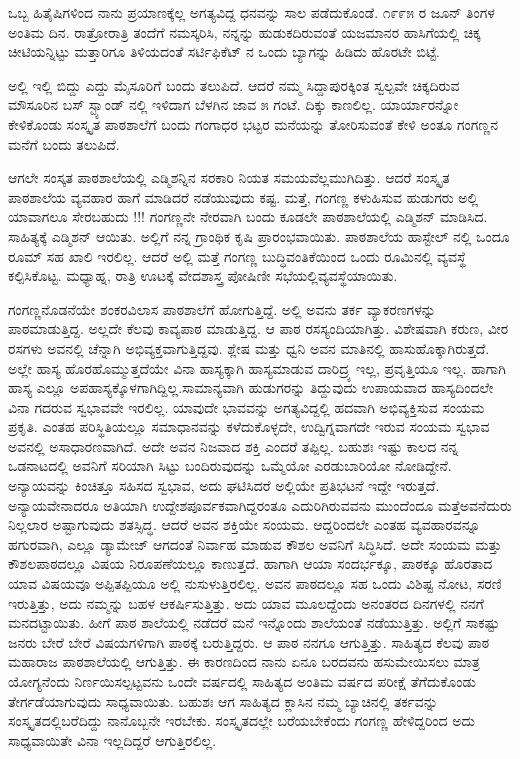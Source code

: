 {ಒಬ್ಬ ಹಿತೈಷಿಗಳಿಂದ ನಾನು ಪ್ರಯಾಣಕ್ಕೆಲ್ಲ ಅಗತ್ಯವಿದ್ದ ಧನವನ್ನು ಸಾಲ ಪಡೆದುಕೊಂಡೆ. ೧೯೯೫ ರ ಜೂನ್ ತಿಂಗಳ ಅಂತಿಮ ದಿನ. ರಾತ್ರೋರಾತ್ರಿ ತಂದೆಗೆ ನಮಸ್ಕರಿಸಿ, ನನ್ನನ್ನು ಹುಡುಕದಿರುವಂತೆ ಯಜಮಾನರ ಹಾಸಿಗೆಯಲ್ಲಿ ಚಿಕ್ಕ ಚೀಟಿಯನ್ನಿಟ್ಟು ಮತ್ತಾರಿಗೂ ತಿಳಿಯದಂತೆ ಸರ್ಟಿಫಿಕೆಟ್ ನ ಒಂದು ಬ್ಯಾಗನ್ನು ಹಿಡಿದು ಹೊರಟೇ ಬಿಟ್ಟೆ.

ಅಲ್ಲಿ ಇಲ್ಲಿ ಬಿದ್ದು ಎದ್ದು ಮೈಸೂರಿಗೆ ಬಂದು ತಲುಪಿದೆ. ಆದರೆ ನಮ್ಮ ಸಿದ್ದಾಪುರಕ್ಕಿಂತ ಸ್ವಲ್ಪವೇ ಚಿಕ್ಕದಿರುವ ಮೌಸೂರಿನ ಬಸ್ ಸ್ಟ್ಯಾಂಡ್ ನಲ್ಲಿ ಇಳಿದಾಗ ಬೆಳಗಿನ ಜಾವ ೫ ಗಂಟೆ. ದಿಕ್ಕು ಕಾಣಲಿಲ್ಲ. ಯಾರ್ಯಾರನ್ನೋ ಕೇಳಿಕೊಂಡು ಸಂಸ್ಕೃತ ಪಾಠಶಾಲೆಗೆ ಬಂದು ಗಂಗಾಧರ ಭಟ್ಟರ ಮನೆಯನ್ನು ತೋರಿಸುವಂತೆ ಕೇಳಿ ಅಂತೂ ಗಂಗಣ್ಣನ ಮನೆಗೆ ಬಂದು ತಲುಪಿದೆ. 

ಆಗಲೇ ಸಂಸ್ಕತ ಪಾಠಶಾಲೆಯಲ್ಲಿ ಎಡ್ಮಿಶನ್ನಿನ ಸರಕಾರಿ ನಿಯತ ಸಮಯವೆಲ್ಲ\break ಮುಗಿದಿತ್ತು. ಆದರೆ ಸಂಸ್ಕೃತ ಪಾಠಶಾಲೆಯ ವ್ಯವಹಾರ ಹಾಗೆ ಮಾಡಿದರೆ ನಡೆಯು\-ವುದು ಕಷ್ಟ. ಮತ್ತೆ, ಗಂಗಣ್ಣ ಕಳುಹಿಸುವ ಹುಡುಗರು ಅಲ್ಲಿ ಯಾವಾಗಲೂ ಸೇರ\-ಬಹುದು !!! ಗಂಗಣ್ಣನೇ ನೇರವಾಗಿ ಬಂದು ಕೂಡಲೇ ಪಾಠಶಾಲೆಯಲ್ಲಿ ಎಡ್ಮಿಶನ್ ಮಾಡಿಸಿದ. ಸಾಹಿತ್ಯಕ್ಕೆ ಎಡ್ಮಿಶನ್ ಆಯಿತು. ಅಲ್ಲಿಗೆ ನನ್ನ ಗ್ರಾಂಥಿಕ ಕೃಷಿ ಪ್ರಾರಂಭ\-ವಾಯಿತು. ಪಾಠಶಾಲೆಯ ಹಾಸ್ಟೇಲ್ ನಲ್ಲಿ ಒಂದೂ ರೂಮ್ ಸಹ ಖಾಲಿ ಇರಲಿಲ್ಲ. ಆದರೆ ಅಲ್ಲಿ ಮತ್ತೆ ಗಂಗಣ್ಣ  ಬುದ್ಧಿವಂತಿಕೆಯಿಂದ ಒಂದು ರೂಮಿನಲ್ಲಿ ವ್ಯವಸ್ಥೆ ಕಲ್ಪಿಸಿ\-ಕೊಟ್ಟ. ಮಧ್ಯಾಹ್ನ, ರಾತ್ರಿ ಊಟಕ್ಕೆ ವೇದಶಾಸ್ತ್ರ ಪೋಷಿಣೀ ಸಭೆಯಲ್ಲಿ\break ವ್ಯವಸ್ಥೆಯಾಯಿತು. 

ಗಂಗಣ್ಣನೊಡನೆಯೇ ಶಂಕರವಿಲಾಸ ಪಾಠಶಾಲೆಗೆ ಹೋಗುತ್ತಿದ್ದೆ. ಅಲ್ಲಿ ಅವನು ತರ್ಕ ವ್ಯಾಕರಣಗಳನ್ನು ಪಾಠಮಾಡುತ್ತಿದ್ದ. ಅಲ್ಲದೇ ಕೆಲವು ಕಾವ್ಯಪಾಠ ಮಾಡುತ್ತಿದ್ದ. ಆ ಪಾಠ ರಸಸ್ಯಂದಿಯಾಗಿತ್ತು. ವಿಶೇಷವಾಗಿ ಕರುಣ, ವೀರ ರಸಗಳು ಅವನಲ್ಲಿ ಚೆನ್ನಾಗಿ ಅಭಿವ್ಯಕ್ತವಾಗುತ್ತಿದ್ದವು. ಶ್ಲೇಷ ಮತ್ತು ಧ್ವನಿ ಅವನ ಮಾತಿನಲ್ಲಿ ಹಾಸುಹೊಕ್ಕಾಗಿರುತ್ತದೆ. ಅಲ್ಲೇ ಹಾಸ್ಯ ಹೊರಹೊಮ್ಮುತ್ತದೆಯೇ ವಿನಾ ಹಾಸ್ಯಕ್ಕಾಗಿ ಹಾಸ್ಯಮಾಡುವ ದಾರಿದ್ರ್ಯ ಇಲ್ಲ, ಪ್ರವೃತ್ತಿಯೂ ಇಲ್ಲ. ಹಾಗಾಗಿ ಹಾಸ್ಯ ಎಲ್ಲೂ ಅಪಹಾಸ್ಯಕ್ಕೊಳಗಾಗಿದ್ದಿಲ್ಲ.\break ಸಾಮಾನ್ಯವಾಗಿ ಹುಡುಗರನ್ನು ತಿದ್ದುವುದು ಉಪಾಯವಾದ ಹಾಸ್ಯದಿಂದಲೇ ವಿನಾ ಗದರುವ ಸ್ವಭಾವವೇ ಇರಲಿಲ್ಲ. ಯಾವುದೇ ಭಾವವನ್ನು ಅಗತ್ಯವಿದ್ದಲ್ಲಿ ಹದವಾಗಿ ಅಭಿವ್ಯಕ್ತಿಸುವ ಸಂಯಮ ಪ್ರಕೃತಿ. ಎಂತಹ ಪರಿಸ್ಥಿತಿಯಲ್ಲೂ ಸಮಾಧಾನವನ್ನು ಕಳೆದು\-ಕೊಳ್ಳದೇ, ಉದ್ವಿಗ್ನವಾಗದೇ ಇರುವ ಸಂಯಮ ಸ್ವಭಾವ ಅವನಲ್ಲಿ ಅಸಾಧಾರಣ\-ವಾಗಿದೆ. ಅದೇ ಅವನ ನಿಜವಾದ ಶಕ್ತಿ ಎಂದರೆ ತಪ್ಪಿಲ್ಲ. ಬಹುಶಃ ಇಷ್ಟು ಕಾಲದ ನನ್ನ ಒಡನಾಟದಲ್ಲಿ ಅವನಿಗೆ ಸರಿಯಾಗಿ ಸಿಟ್ಟು ಬಂದಿರುವುದನ್ನು   ಒಮ್ಮೆಯೋ ಎರಡು\break ಬಾರಿಯೋ ನೋಡಿದ್ದೇನೆ. ಅನ್ಯಾಯವನ್ನು ಕಿಂಚಿತ್ತೂ ಸಹಿಸದ ಸ್ವಭಾವ, ಅದು ಘಟಿಸಿದರೆ ಅಲ್ಲಿಯೇ ಪ್ರತಿಭಟನೆ ಇದ್ದೇ ಇರುತ್ತದೆ. ಅನ್ಯಾಯವೇನಾದರೂ  ಅತಿಯಾಗಿ ಉದ್ದೇಶಪೂರ್ವಕವಾಗಿದ್ದರಂತೂ ಎದುರಿಗಿರುವವನು ಮುಂದೆಂದೂ ಮತ್ತೆ\break ಅವನೆದುರು ನಿಲ್ಲಲಾರ \enginline{-} ಅಷ್ಟಾಗುವುದು ಶತಸ್ಸಿದ್ಧ. ಆದರೆ ಅವನ ಶಕ್ತಿಯೇ ಸಂಯಮ. ಆದ್ದರಿಂದಲೇ ಎಂತಹ ವ್ಯವಹಾರವನ್ನೂ ಹಗುರವಾಗಿ, ಎಲ್ಲೂ ಡ್ಯಾಮೇಜ್ ಆಗದಂತೆ ನಿರ್ವಾಹ ಮಾಡುವ ಕೌಶಲ ಅವನಿಗೆ ಸಿದ್ಧಿಸಿದೆ. ಅದೇ ಸಂಯಮ ಮತ್ತು ಕೌಶಲ\break ಪಾಠದಲ್ಲೂ ವಿಷಯ ನಿರೂಪಣೆಯಲ್ಲೂ ಕಾಣುತ್ತದೆ. ಹಾಗಾಗಿ ಆಯಾ \hbox{ಸಂದರ್ಭಕ್ಕೂ}, ಪಾಠಕ್ಕೂ ಹೊರತಾದ ಯಾವ ವಿಷಯವೂ ಅಪ್ಪಿತಪ್ಪಿಯೂ ಅಲ್ಲಿ ನುಸುಳುತ್ತಿರ\-ಲಿಲ್ಲ. ಅವನ ಪಾಠದಲ್ಲೂ ಸಹ ಒಂದು ವಿಶಿಷ್ಟ ನೋಟ, ಸರಣಿ ಇರುತ್ತಿತ್ತು, ಅದು ನಮ್ಮನ್ನು ಬಹಳ ಆಕರ್ಷಿಸುತ್ತಿತ್ತು. ಅದು ಯಾವ ಮೂಲದ್ದೆಂದು ಅನಂತರದ ದಿನಗಳಲ್ಲಿ ನನಗೆ ಮನದಟ್ಟಾಯಿತು. ಹೀಗೆ ಪಾಠ ಶಾಲೆಯಲ್ಲಿ ನಡೆದರೆ ಮನೆ ಇನ್ನೊಂದು \hbox{ಶಾಲೆಯಂತೆ} ನಡೆಯುತ್ತಿತ್ತು. ಅಲ್ಲಿಗೆ ಸಾಕಷ್ಟು ಜನರು ಬೇರೆ ಬೇರೆ ವಿಷಯಗಳಿಗಾಗಿ ಪಾಠಕ್ಕೆ ಬರುತ್ತಿದ್ದರು. ಆ ಪಾಠ ನನಗೂ ಆಗುತ್ತಿತ್ತು. ಸಾಹಿತ್ಯದ ಕೆಲವು ಪಾಠ ಮಹಾರಾಜ ಪಾಠ\-ಶಾಲೆಯಲ್ಲಿ ಆಗುತ್ತಿತ್ತು. ಈ ಕಾರಣದಿಂದ ನಾನು ಏನೂ ಬರದವನು ಹಸು\break ಮೇಯಿಸಲು ಮಾತ್ರ ಯೋಗ್ಯನೆಂದು ನಿರ್ಣಯಿಸಲ್ಪಟ್ಟವನು ಒಂದೇ ವರ್ಷದಲ್ಲಿ ಸಾಹಿತ್ಯದ ಅಂತಿಮ ವರ್ಷದ ಪರೀಕ್ಷೆ ತೆಗೆದುಕೊಂಡು ತೇರ್ಗಡೆಯಾಗುವುದು ಸಾಧ್ಯ\-ವಾಯಿತು. ಬಹುಶಃ ಆಗ ಸಾಹಿತ್ಯದ ಕ್ಲಾಸಿನ ನಮ್ಮ ಬ್ಯಾಚಿನಲ್ಲಿ ತರ್ಕವನ್ನು ಸಂಸ್ಕೃತದಲ್ಲಿ\break ಬರೆದಿದ್ದು ನಾನೊಬ್ಬನೇ ಇರಬೇಕು. ಸಂಸ್ಕೃತದಲ್ಲೇ ಬರೆಯಬೇಕೆಂದು ಗಂಗಣ್ಣ ಹೇಳಿದ್ದರಿಂದ ಅದು ಸಾಧ್ಯವಾಯಿತೇ ವಿನಾ ಇಲ್ಲದಿದ್ದರೆ ಆಗುತ್ತಿರಲಿಲ್ಲ.

}
